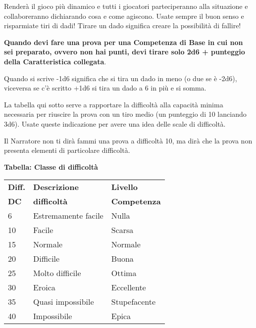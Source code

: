 \begin{multicols}{2}
\begin{narratore}
Renderà il gioco più dinamico e tutti i giocatori parteciperanno alla situazione e collaboreranno dichiarando cosa e come agiscono. Usate sempre il buon senso e risparmiate tiri di dadi! Tirare un dado significa creare la possibilità di fallire!
\end{narratore}

%

\medskip

\textbf{Quando devi fare una prova per una Competenza di Base in cui non sei preparato, ovvero non hai punti, devi tirare solo 2d6 + punteggio della Caratteristica collegata}.

Quando si scrive -1d6 significa che si tira un dado in meno (o due se è -2d6), viceversa se c'è scritto +1d6 si tira un dado a 6 in più e si somma.

La tabella qui sotto serve a rapportare la difficoltà alla capacità minima necessaria per riuscire la prova con un tiro medio (un punteggio di 10 lanciando 3d6). Usate queste indicazione per avere una idea delle scale di difficoltà.

Il Narratore non ti dirà fammi una prova a difficoltà 10, ma dirà che la prova non presenta elementi di particolare difficoltà.

%

\medskip

\textbf{Tabella: Classe di difficoltà}\label{basedifficolta}

\medskip

\noindent\begin{tabularx}{\linewidth}{lll}
	\toprule
\rowcolor{gray!20}\textbf{Diff.} & \textbf{Descrizione} & \textbf{Livello}\\
\textbf{DC}&\textbf{difficoltà}& \textbf{Competenza}\\
\toprule
\rowcolor{gray!20}6 & Estremamente facile & Nulla\\
10 & Facile & Scarsa\\
\rowcolor{gray!20}15 & Normale & Normale\\
20 & Difficile & Buona\\
\rowcolor{gray!20}25 & Molto difficile & Ottima\\
30 & Eroica& Eccellente\\
\rowcolor{gray!20}35 & Quasi impossibile & Stupefacente\\
40 & Impossibile & Epica
\end{tabularx}


\end{multicols}
